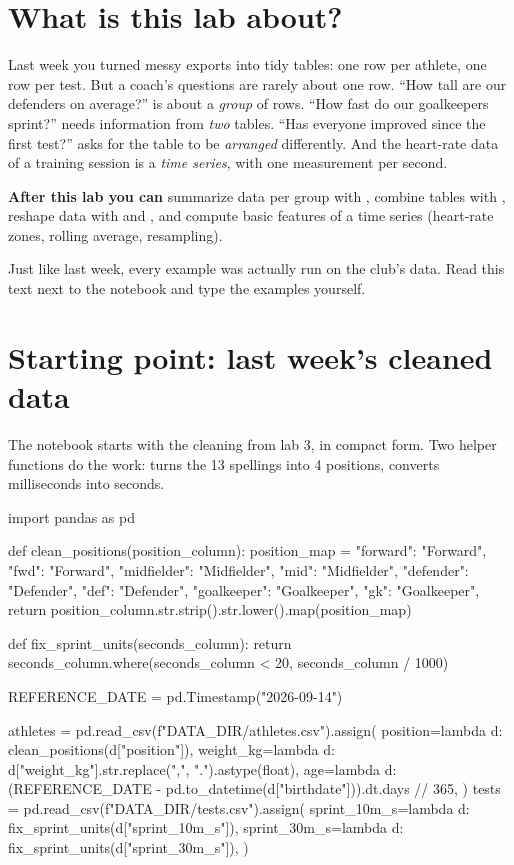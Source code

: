 \documentclass[11pt,a4paper]{article}
\author{dr. Maarten Slembrouck}
\begin{document}

\section*{What is this lab about?}

Last week you turned messy exports into tidy tables: one row per
athlete, one row per test. But a coach's questions are rarely about one
row. ``How tall are our defenders on average?'' is about a \emph{group}
of rows. ``How fast do our goalkeepers sprint?'' needs information from
\emph{two} tables. ``Has everyone improved since the first test?'' asks
for the table to be \emph{arranged} differently. And the heart-rate data
of a training session is a \emph{time series}, with one measurement per
second.

\textbf{After this lab you can} summarize data per group with
, combine tables with , reshape data with
 and , and compute basic features of a
time series (heart-rate zones, rolling average, resampling).

Just like last week, every example was actually run on the club's data.
Read this text next to the notebook and type the examples yourself.

\section{Starting point: last week's cleaned data}

The notebook starts with the cleaning from lab 3, in compact form. Two
helper functions do the work:  turns the 13
spellings into 4 positions,  converts
milliseconds into seconds.

\begin{python}[noout]
import pandas as pd

def clean_positions(position_column):
    position_map = {
        "forward": "Forward", "fwd": "Forward",
        "midfielder": "Midfielder", "mid": "Midfielder",
        "defender": "Defender", "def": "Defender",
        "goalkeeper": "Goalkeeper", "gk": "Goalkeeper",
    }
    return position_column.str.strip().str.lower().map(position_map)

def fix_sprint_units(seconds_column):
    return seconds_column.where(seconds_column < 20, seconds_column / 1000)

REFERENCE_DATE = pd.Timestamp("2026-09-14")

athletes = pd.read_csv(f"{DATA_DIR}/athletes.csv").assign(
    position=lambda d: clean_positions(d["position"]),
    weight_kg=lambda d: d["weight_kg"].str.replace(",", ".").astype(float),
    age=lambda d: (REFERENCE_DATE - pd.to_datetime(d["birthdate"])).dt.days // 365,
)
tests = pd.read_csv(f"{DATA_DIR}/tests.csv").assign(
    sprint_10m_s=lambda d: fix_sprint_units(d["sprint_10m_s"]),
    sprint_30m_s=lambda d: fix_sprint_units(d["sprint_30m_s"]),
)
\end{python}
\end{document}
